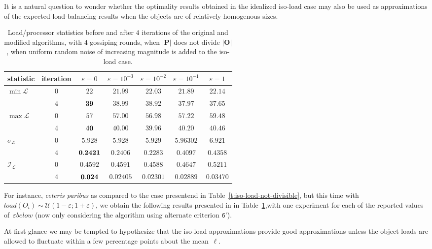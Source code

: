 It is a natural question to wonder whether the optimality results
obtained in the idealized iso-load case may also be used as
approximations of the expected load-balancing results when the objects
are of relatively homogenous sizes.

\begin{table}[htb!]
\begin{center}
\begin{tabular}{lcccccc}
\hline
statistic & iteration
& $\varepsilon=0$
& $\varepsilon=10^{-3}$
& $\varepsilon=10^{-2}$
& $\varepsilon=10^{-1}$
& $\varepsilon=1$ \\
\hline\hline
\multirow{2}{*}{$\min{\mathcal{L}}$}
&$0$ &$22$ &$21.99$ &$22.03$ &$21.89$ &$22.14$ \\
&$4$ &$\bf39$ &$38.99$ &$38.92$ &$37.97$ &$37.65$ \\\hline
\multirow{2}{*}{$\max{\mathcal{L}}$}
&$0$ &$57$ &$57.00$ &$56.98$ &$57.22$ &$59.48$ \\
&$4$ &$\bf40$ &$40.00$ &$39.96$ &$40.20$ &$40.46$ \\\hline
\multirow{2}{*}{$\sigma_{\mathcal{L}}$}
&$0$ &$5.928$ &$5.928$ &$5.929$ &$5.96302$ &$6.921$ \\
&$4$ &$\bf0.2421$ &$0.2406$ &$0.2283$ &$0.4097$ &$0.4358$ \\\hline
\multirow{2}{*}{$\mathcal{I}_\mathcal{L}$}
&$0$ &$0.4592$ &$0.4591$ &$0.4588$ &$0.4647$ &$0.5211$ \\
&$4$ &$\bf0.024$ &$0.02405$ &$0.02301$ &$0.02889$ &$0.03470$ \\\hline
\end{tabular}
\end{center}
\caption{\label{t:iso-load-not-divisible-epsilon-i4}
Load/processor statistics before and after $4$ iterations of the
original and modified algorithms, with $4$ gossiping rounds, when
$\vert\mathbf{P}\vert$ does not divide $\vert\mathbf{O}\vert$, when
uniform random noise of increasing magnitude is added to the iso-load
case.}
\end{table}
For instance, \emph{ceteris paribus} as compared to the case
presentend in Table~\ref{t:iso-load-not-divisible}, but this time with 
$load(O_i)\sim\mathcal{U}(1-\varepsilon;1+\varepsilon)$, we obtain the
following results presented in in
Table~\ref{t:iso-load-not-divisible-epsilon-i4},with one experiment for
each of the reported values of~$\varepsilon below$ (now only
considering the algorithm using alternate 
criterion $\texttt{6'}$).

At first glance we may be tempted to hypothesize that the iso-load
approximations provide good approximations unless the object loads are
allowed to fluctuate within a few percentage points about the mean~$\ell$.
